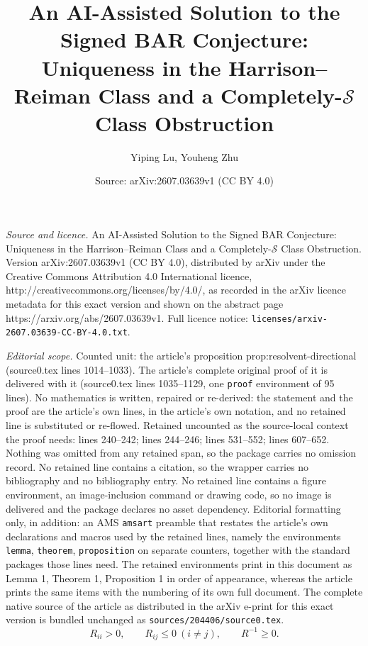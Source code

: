 \documentclass[10pt,a4paper]{amsart}
\title{\vspace{-0.6in}An AI-Assisted Solution to the Signed BAR Conjecture: Uniqueness in the Harrison--Reiman Class and a Completely-$\mathcal{S}$ Class Obstruction}
\author{Yiping Lu, Youheng Zhu}
\date{Source: arXiv:2607.03639v1 (CC BY 4.0)}
\begin{document}
\maketitle

\noindent\emph{Source and licence.} \vspace{-0.6in}An AI-Assisted Solution to the Signed BAR Conjecture: Uniqueness in the Harrison--Reiman Class and a Completely-$\mathcal{S}$ Class Obstruction. Version arXiv:2607.03639v1 (CC BY 4.0), distributed by arXiv under the Creative Commons Attribution 4.0 International licence, http://creativecommons.org/licenses/by/4.0/, as recorded in the arXiv licence metadata for this exact version and shown on the abstract page https://arxiv.org/abs/2607.03639v1. Full licence notice: \texttt{licenses/arxiv-2607.03639-CC-BY-4.0.txt}.\par\smallskip

\noindent\textit{Editorial scope.} Counted unit: the article's proposition prop:resolvent-directional (source0.tex lines 1014--1033). The article's complete original proof of it is delivered with it (source0.tex lines 1035--1129, one \texttt{proof} environment of 95 lines). No mathematics is written, repaired or re-derived: the statement and the proof are the article's own lines, in the article's own notation, and no retained line is substituted or re-flowed.  Retained uncounted as the source-local context the proof needs: lines 240--242; lines 244--246; lines 531--552; lines 607--652.  Nothing was omitted from any retained span, so the package carries no omission record.  No retained line contains a citation, so the wrapper carries no bibliography and no bibliography entry.  No retained line contains a figure environment, an image-inclusion command or drawing code, so no image is delivered and the package declares no asset dependency.  Editorial formatting only, in addition: an AMS \texttt{amsart} preamble that restates the article's own declarations and macros used by the retained lines, namely the environments \texttt{lemma}, \texttt{theorem}, \texttt{proposition} on separate counters, together with the standard packages those lines need.  The retained environments print in this document as Lemma 1, Theorem 1, Proposition 1 in order of appearance, whereas the article prints the same items with the numbering of its own full document.  The complete native source of the article as distributed in the arXiv e-print for this exact version is bundled unchanged as \texttt{sources/204406/source0.tex}.
\begin{equation}\label{eq:Mmatrix}
 R_{ii}>0,\qquad R_{ij}\le0\ (i\ne j),\qquad R^{-1}\ge0.
\end{equation}
\end{document}
